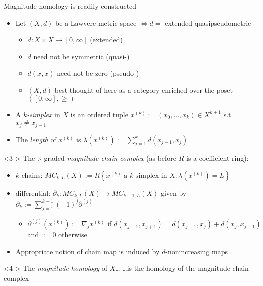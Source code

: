 \documentclass[usenames,dvipsnames,10pt,aspectratio=169]{beamer}
\begin{document}
\begin{frame}{Magnitude homology is readily constructed}
	\begin{itemize}
		\item<1-> Let $(X,d)$ be a Lawvere metric space $\Leftrightarrow d =$ extended quasipseudometric
		\begin{itemize}
			\item<1-> $d : X \times X \rightarrow [0,\infty]$ \hfill (extended)
			\item<1-> $d$ need not be symmetric \hfill (quasi-)
			\item<1-> $d(x,x)$ need not be zero \hfill (pseudo-)
			\item<1-> $(X,d)$ best thought of here as a category enriched over the poset $([0,\infty],\ge)$
		\end{itemize}
		\item<2-> A \emph{$k$-simplex} in $X$ is an ordered tuple $x^{(k)} := (x_0,\dots,x_k) \in X^{k+1}$ s.t. $x_j \ne x_{j-1}$ %
		\item<2-> The \emph{length} of $x^{(k)}$ is $\lambda(x^{(k)}) := \sum_{j=1}^k d(x_{j-1},x_j)$
	\end{itemize}
	\begin{block}<3-> {The $\mathbb{R}$-graded \emph{magnitude chain complex} (as before $R$ is a coefficient ring):}
		 \begin{itemize}
		 	\item $k$-chains: $MC_{k,L}(X) := R \left \{ x^{(k)} \text{ a $k$-simplex in $X$} : \lambda(x^{(k)}) = L \right \}$
			\item differential: $\partial_k : MC_{k,L}(X) \rightarrow MC_{k-1,L}(X)$ given by $\partial_k := \sum_{j=1}^{k-1} (-1)^j \partial^{(j)}$
			\begin{itemize}
				\item $\partial^{(j)}(x^{(k)}) := \nabla_j x^{(k)} \text{ if } d(x_{j-1},x_{j+1}) = d(x_{j-1},x_j) + d(x_j,x_{j+1})$ and $:= 0 \text{ otherwise}$
			\end{itemize}
			\item Appropriate notion of chain map is induced by $d$-nonincreasing maps
		 \end{itemize} 
	\end{block}
	\begin{alertblock}<4-> {The \emph{magnitude homology} of $X$\dots}
		\dots is the homology of the magnitude chain complex
	\end{alertblock} 
\end{frame}
\end{document}
